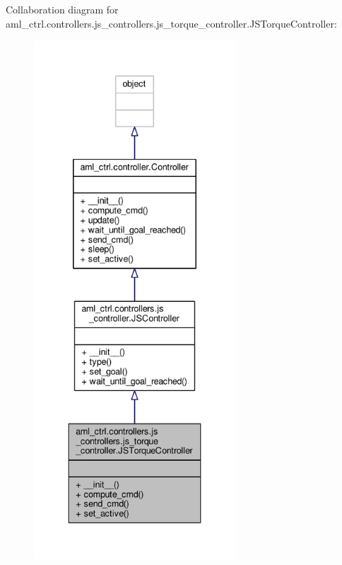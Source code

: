 Collaboration diagram for aml\-\_\-ctrl.\-controllers.\-js\-\_\-controllers.\-js\-\_\-torque\-\_\-controller.\-J\-S\-Torque\-Controller\-:\nopagebreak
\begin{figure}[H]
\begin{center}
\leavevmode
\includegraphics[height=550pt]{classaml__ctrl_1_1controllers_1_1js__controllers_1_1js__torque__controller_1_1_j_s_torque_controller__coll__graph}
\end{center}
\end{figure}
